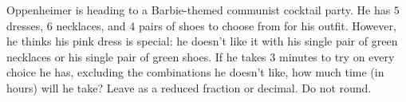 Oppenheimer is heading to a Barbie-themed communist cocktail party. He has $5$ dresses, $6$ necklaces, and $4$ pairs of shoes to choose from for his outfit. However, he thinks his pink dress is special: he doesn't like it with his single pair of green necklaces or his single pair of green shoes. If he takes $3$ minutes to try on every choice he has, excluding the combinations he doesn't like, how much time (in hours) will he take? Leave as a reduced fraction or decimal. Do not round.
